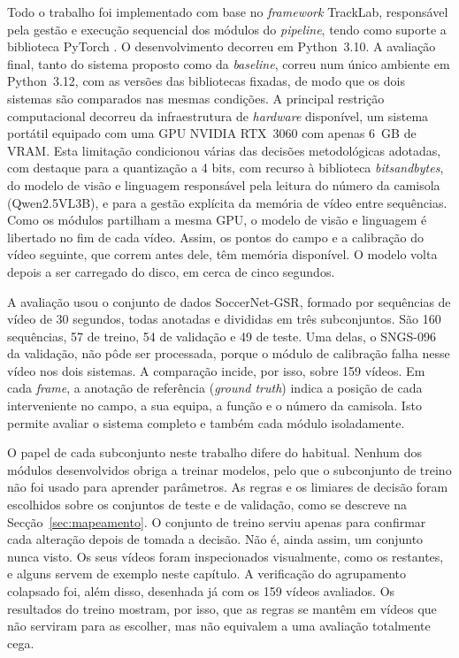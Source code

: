 Todo o trabalho foi implementado com base no \emph{framework} TrackLab, responsável pela gestão e execução sequencial dos módulos do \emph{pipeline}, tendo como suporte a biblioteca PyTorch \citep{paszke2019pytorch}. O desenvolvimento decorreu em Python~3.10. A avaliação final, tanto do sistema proposto como da \emph{baseline}, correu num único ambiente em Python~3.12, com as versões das bibliotecas fixadas, de modo que os dois sistemas são comparados nas mesmas condições. A principal restrição computacional decorreu da infraestrutura de \emph{hardware} disponível, um sistema portátil equipado com uma GPU NVIDIA RTX~3060 com apenas 6~GB de VRAM. Esta limitação condicionou várias das decisões metodológicas adotadas, com destaque para a quantização a 4 bits, com recurso à biblioteca \emph{bitsandbytes}, do modelo de visão e linguagem responsável pela leitura do número da camisola (Qwen2.5VL3B), e para a gestão explícita da memória de vídeo entre sequências. Como os módulos partilham a mesma GPU, o modelo de visão e linguagem é libertado no fim de cada vídeo. Assim, os pontos do campo e a calibração do vídeo seguinte, que correm antes dele, têm memória disponível. O modelo volta depois a ser carregado do disco, em cerca de cinco segundos.

A avaliação usou o conjunto de dados SoccerNet-GSR, formado por sequências de vídeo de 30 segundos, todas anotadas e divididas em três subconjuntos. São 160 sequências, 57 de treino, 54 de validação e 49 de teste. Uma delas, o SNGS-096 da validação, não pôde ser processada, porque o módulo de calibração falha nesse vídeo nos dois sistemas. A comparação incide, por isso, sobre 159 vídeos. Em cada \emph{frame}, a anotação de referência (\emph{ground truth}) indica a posição de cada interveniente no campo, a sua equipa, a função e o número da camisola. Isto permite avaliar o sistema completo e também cada módulo isoladamente.

O papel de cada subconjunto neste trabalho difere do habitual. Nenhum dos módulos desenvolvidos obriga a treinar modelos, pelo que o subconjunto de treino não foi usado para aprender parâmetros. As regras e os limiares de decisão foram escolhidos sobre os conjuntos de teste e de validação, como se descreve na Secção~\ref{sec:mapeamento}. O conjunto de treino serviu apenas para confirmar cada alteração depois de tomada a decisão. Não é, ainda assim, um conjunto nunca visto. Os seus vídeos foram inspecionados visualmente, como os restantes, e alguns servem de exemplo neste capítulo. A verificação do agrupamento colapsado foi, além disso, desenhada já com os 159 vídeos avaliados. Os resultados do treino mostram, por isso, que as regras se mantêm em vídeos que não serviram para as escolher, mas não equivalem a uma avaliação totalmente cega.


